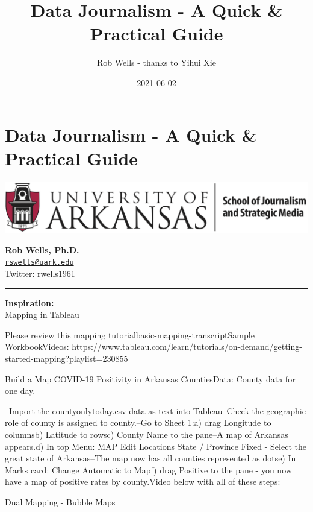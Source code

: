 \documentclass[]{book}
\title{Data Journalism - A Quick \& Practical Guide}
\author{Rob Wells - thanks to Yihui Xie}
\date{2021-06-02}
\begin{document}
\maketitle

{
\setcounter{tocdepth}{1}
\tableofcontents
}
\hypertarget{data-journalism---a-quick-practical-guide}{%
\chapter*{Data Journalism - A Quick \& Practical Guide}\label{data-journalism---a-quick-practical-guide}}

\includegraphics{Images/UARK logo NEW.png}

\textbf{Rob Wells, Ph.D.}\\
\href{mailto:rswells@uark.edu}{\nolinkurl{rswells@uark.edu}}\\
Twitter: rwells1961

\begin{center}\rule{0.5\linewidth}{0.5pt}\end{center}

\textbf{Inspiration:}\\

Mapping in Tableau

Please review this mapping tutorialbasic-mapping-transcriptSample WorkbookVideos: https://www.tableau.com/learn/tutorials/on-demand/getting-started-mapping?playlist=230855

Build a Map COVID-19 Positivity in Arkansas CountiesData: County data for one day.

--Import the countyonlytoday.csv data as text into Tableau--Check the geographic role of county is assigned to county.--Go to Sheet 1:a) drag Longitude to columnsb) Latitude to rowsc) County Name to the pane--A map of Arkansas appears.d) In top Menu: MAP \textbar{} Edit Locations \textbar{} State / Province \textbar{} Fixed - Select the great state of Arkansas--The map now has all counties represented as dotse) In Marks card: Change Automatic to Mapf) drag Positive to the pane - you now have a map of positive rates by county.Video below with all of these steps:

Dual Mapping - Bubble Maps
\end{document}
